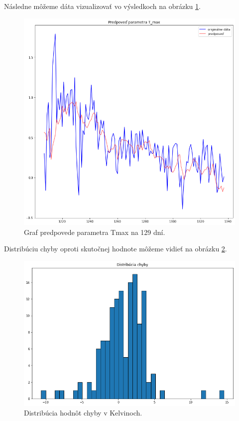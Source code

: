 \newline
Následne môžeme dáta vizualizovať vo výsledkoch na obrázku \ref{predpoved}.
\begin{figure}[!htbp]
  \centering
  \includegraphics[width=14cm]{img/predpoved_T_max.png}
  \caption{Graf predpovede parametra Tmax na 129 dní.}
  \label{predpoved}
\end{figure}

\newline
Distribúciu chyby oproti skutočnej hodnote môžeme vidieť na obrázku \ref{dist_error}.
\begin{figure}[!htbp]
  \centering
  \includegraphics[width=14cm]{img/distro_chyby.png}
  \caption{Distribúcia hodnôt chyby v Kelvinoch.}
  \label{dist_error}
\end{figure}

